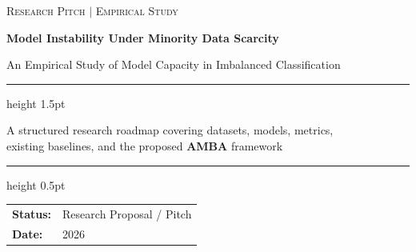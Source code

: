 \documentclass[11pt,a4paper]{article}
\begin{document}
\begin{titlepage}
\centering
\vspace*{2cm}
{\small\color{darkgrey}\scshape Research Pitch $\mid$ Empirical Study\par}
\vspace{0.8cm}
{\LARGE\bfseries\color{accentblue} Model Instability Under Minority Data Scarcity\par}
\vspace{0.5cm}
{\Large An Empirical Study of Model Capacity in Imbalanced Classification\par}
\vspace{1.2cm}
\hrule height 1.5pt
\vspace{0.4cm}
{\large A structured research roadmap covering datasets, models, metrics,\\
existing baselines, and the proposed \textbf{AMBA} framework\par}
\vspace{0.4cm}
\hrule height 0.5pt
\vspace{2cm}
\begin{tabular}{ll}
\textbf{Status:} & Research Proposal / Pitch \\[4pt]
\textbf{Date:}   & 2026 \\
\end{tabular}
\vfill
\end{titlepage}
\end{document}
